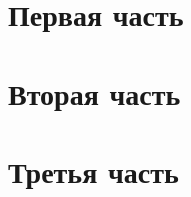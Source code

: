 \documentclass[a4paper,14pt,oneside,openany]{memoir}
\begin{document}
    
    

    \chapter{Первая часть}
    

    \chapter{Вторая часть}
    

    \chapter{Третья часть}
    

    
\end{document}
